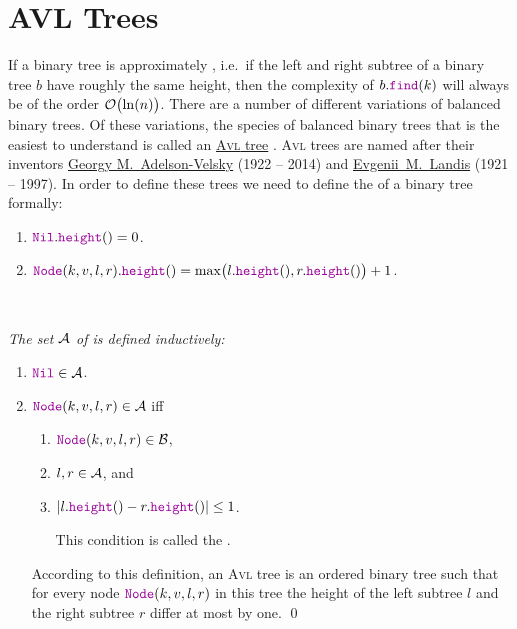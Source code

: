 \section{AVL Trees}
If a binary tree is approximately , i.e.~if the left and right subtree of a binary tree $b$  have
roughly the same height, then the complexity of $b.\mytt{find}(k)$ will always be of the order
$\mathcal{O}\bigl(\ln(n)\bigr)$.  There are a number of different variations of
balanced binary trees.  Of these variations, the species of balanced binary trees that is the easiest to understand is
called an \href{https://en.wikipedia.org/wiki/Avl_tree}{\textsc{Avl} tree} \cite{adelson:62}.  \textsc{Avl} trees are 
named after their inventors \href{https://en.wikipedia.org/wiki/Georgy_Adelson-Velsky}{Georgy M.~Adelson-Velsky}
(1922 -- 2014) and \href{https://en.wikipedia.org/wiki/Evgenii_Landis}{Evgenii~M.~Landis} (1921 -- 1997).
In order to define these trees we need to define the  of a binary tree formally:
\begin{enumerate}
\item $\mytt{Nil}.\mytt{height}() = 0$.
\item $\mytt{Node}(k,v,l,r).\mytt{height}() = 
       \max\bigl( l.\mytt{height}(), r.\mytt{height}() \bigr) + 1$. \eox
\end{enumerate}

\begin{Definition} \hspace*{\fill} \\
{\em 
  The set $\mathcal{A}$ of   is defined inductively:
  \begin{enumerate}
  \item $\mytt{Nil} \in \AVL$.
  \item $\mytt{Node}(k,v,l,r) \in \AVL$ \quad iff 
        \begin{enumerate}
        \item $\mytt{Node}(k,v,l,r) \in \Bin$,
        \item $l, r \in \mathcal{A}$, \quad and
        \item $|l.\mytt{height}() - r.\mytt{height}()| \leq 1$.

              This condition is called the . 
        \end{enumerate}
        According to this definition, an \textsc{Avl} tree is an ordered binary tree such that for every node
        $\mytt{Node}(k,v,l,r)$ in this tree the height of the left subtree $l$ and the right
        subtree  $r$ differ at most by one.  \qed
  \end{enumerate}
}  
\end{Definition}

